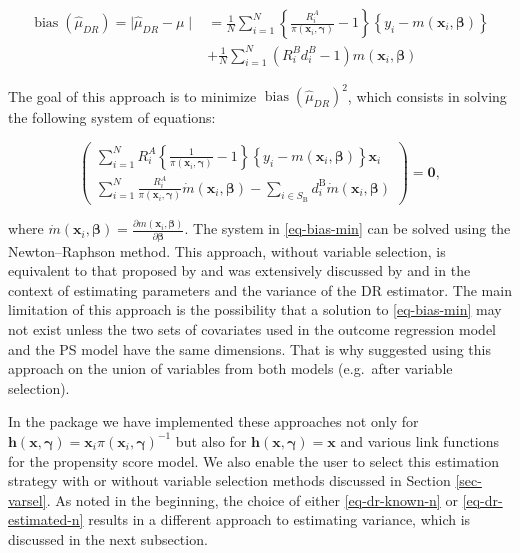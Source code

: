 \documentclass[
]{jss}
\begin{document}
\begin{equation}
\begin{aligned}
\operatorname{bias}\left(\hat{\mu}_{D R}\right) = \mid\hat{\mu}_{DR}-\mu\mid &=\frac{1}{N} \sum_{i=1}^N\left\{\frac{R_i^A}{\pi\left(\boldsymbol{x}_i, \boldsymbol{\gamma}\right)} - 1\right\}\left\{y_i-m\left(\boldsymbol{x}_i, \boldsymbol{\beta}\right)\right\}\\
& + \frac{1}{N} \sum_{i=1}^N\left(R_i^B d_i^B-1\right) m\left(\boldsymbol{x}_i, \boldsymbol{\beta}\right)
\end{aligned}
\label{eq-dr-bias}
\end{equation}

The goal of this approach is to minimize
\(\operatorname{bias}\left(\hat{\mu}_{D R}\right)^2\), which consists in
solving the following system of equations:

\begin{equation}
\left(\begin{array}{c}
\sum_{i=1}^N R_i^A\left\{\frac{1}{\pi\left(\boldsymbol{x}_i, \boldsymbol{\gamma}\right)}-1\right\}\left\{y_i-m\left(\boldsymbol{x}_i, \boldsymbol{\beta}\right)\right\} \boldsymbol{x}_i \\
\sum_{i=1}^N \frac{R_i^A}{\pi\left(\boldsymbol{x}_i, \boldsymbol{\gamma}\right)} \dot{m}\left(\boldsymbol{x}_i, \boldsymbol{\beta}\right) -\sum_{i \in S_{\mathrm{B}}} d_i^{\mathrm{B}} \dot{m}\left(\boldsymbol{x}_i, \boldsymbol{\beta}\right)
\end{array}\right) = \boldsymbol{0},
\label{eq-bias-min}
\end{equation}

where
\(\dot{m}\left(\boldsymbol{x}_i, \boldsymbol{\beta}\right)=\frac{\partial m\left(\boldsymbol{x}_i, \boldsymbol{\beta}\right)}{\partial \boldsymbol{\beta}}\).
The system in \eqref{eq-bias-min} can be solved using the
Newton--Raphson method. This approach, without variable selection, is
equivalent to that proposed by \citet{kim2014doubly} and was extensively
discussed by \citet{chen2020doubly} and \citet{wu2022statistical} in the
context of estimating parameters and the variance of the DR estimator.
The main limitation of this approach is the possibility that a solution
to \eqref{eq-bias-min} may not exist unless the two sets of covariates
used in the outcome regression model and the PS model have the same
dimensions. That is why \citet{yang_doubly_2020} suggested using this
approach on the union of variables from both models (e.g.~after variable
selection).

In the  package we have implemented these approaches not
only for
\(\boldsymbol{h}(\boldsymbol{x}, \boldsymbol{\gamma})=\boldsymbol{x}_i \pi\left(\boldsymbol{x}_i, \boldsymbol{\gamma}\right)^{-1}\)
but also for
\(\boldsymbol{h}(\boldsymbol{x}, \boldsymbol{\gamma})=\boldsymbol{x}\)
and various link functions for the propensity score model. We also
enable the user to select this estimation strategy with or without
variable selection methods discussed in Section \ref{sec-varsel}. As
noted in the beginning, the choice of either \eqref{eq-dr-known-n} or
\eqref{eq-dr-estimated-n} results in a different approach to estimating
variance, which is discussed in the next subsection.
\end{document}
